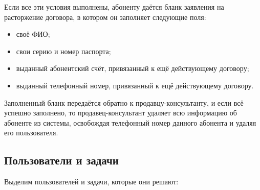 Если все эти условия выполнены, абоненту даётся бланк заявления на расторжение договора, в котором он заполняет следующие поля:
\begin{itemize}
    \item своё ФИО;
    \item свои серию и номер паспорта;
    \item выданный абонентский счёт, привязанный к ещё действующему договору;
    \item выданный телефонный номер, привязанный к ещё действующему договору.
\end{itemize}

Заполненный бланк передаётся обратно к продавцу-консультанту, и если всё успешно заполнено, то продавец-консультант удаляет всю информацию об абоненте из системы, освобождая телефонный номер данного абонента и удаляя его пользователя.


\subsection{Пользователи и задачи}


Выделим пользователей и задачи, которые они решают:


